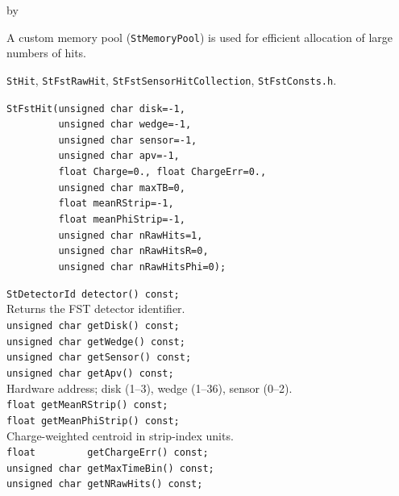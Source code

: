 \documentclass[twoside]{article}
\newcommand{\entrylabel}[1]{\mbox{\textbf{{#1}}}\hfil}%
\newenvironment{entry}
{\begin{list}{}%
    {\renewcommand{\makelabel}{\entrylabel}%
     \setlength{\labelwidth}{90pt}%
     \setlength{\leftmargin}{\labelwidth}
     \advance\leftmargin by \labelsep%
      }%
    }%
  {\end{list}}
\newcommand{\Entrylabel}[1]%
{\raisebox{0pt}[1ex][0pt]{\makebox[\labelwidth][l]%
    {\parbox[t]{\labelwidth}{\hspace{0pt}\textbf{{#1}}}}}}
\newenvironment{Entry}%
{\renewcommand{\entrylabel}{\Entrylabel}\begin{entry}}%
  {\end{entry}}
\begin{document}
\begin{Entry}
  A custom memory pool (\texttt{StMemoryPool}) is used for efficient allocation of large
  numbers of hits.
\item[Related Classes]
  \texttt{StHit}, \texttt{StFstRawHit}, \texttt{StFstSensorHitCollection},
  \texttt{StFstConsts.h}.
\item[Public\\ Constructors]
    \verb+StFstHit(unsigned char disk=-1,+\\
    \verb+         unsigned char wedge=-1,+\\
    \verb+         unsigned char sensor=-1,+\\
    \verb+         unsigned char apv=-1,+\\
    \verb+         float Charge=0., float ChargeErr=0.,+\\
    \verb+         unsigned char maxTB=0,+\\
    \verb+         float meanRStrip=-1,+\\
    \verb+         float meanPhiStrip=-1,+\\
    \verb+         unsigned char nRawHits=1,+\\
    \verb+         unsigned char nRawHitsR=0,+\\
    \verb+         unsigned char nRawHitsPhi=0);+\\
\item[Public Member\\ Functions]
    \verb+StDetectorId detector() const;+\\
    Returns the FST detector identifier.\\[2pt]
    \verb+unsigned char getDisk() const;+\\
    \verb+unsigned char getWedge() const;+\\
    \verb+unsigned char getSensor() const;+\\
    \verb+unsigned char getApv() const;+\\
    Hardware address; disk (1--3), wedge (1--36), sensor (0--2).\\[2pt]
    \verb+float getMeanRStrip() const;+\\
    \verb+float getMeanPhiStrip() const;+\\
    Charge-weighted centroid in strip-index units.\\[2pt]
    \verb+float         getChargeErr() const;+\\
    \verb+unsigned char getMaxTimeBin() const;+\\
    \verb+unsigned char getNRawHits() const;+\\

\end{Entry}
\end{document}
